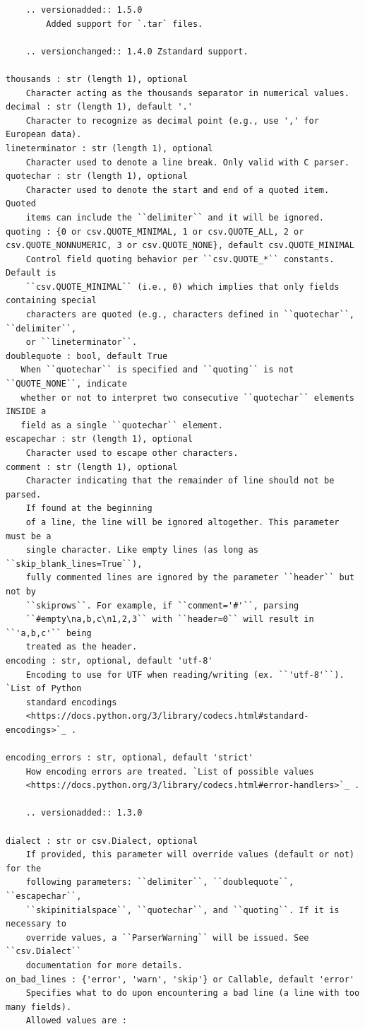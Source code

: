 \documentclass[
  letterpaper,
  DIV=11,
  numbers=noendperiod]{scrreprt}
\begin{document}
\begin{verbatim}
    .. versionadded:: 1.5.0
        Added support for `.tar` files.

    .. versionchanged:: 1.4.0 Zstandard support.

thousands : str (length 1), optional
    Character acting as the thousands separator in numerical values.
decimal : str (length 1), default '.'
    Character to recognize as decimal point (e.g., use ',' for European data).
lineterminator : str (length 1), optional
    Character used to denote a line break. Only valid with C parser.
quotechar : str (length 1), optional
    Character used to denote the start and end of a quoted item. Quoted
    items can include the ``delimiter`` and it will be ignored.
quoting : {0 or csv.QUOTE_MINIMAL, 1 or csv.QUOTE_ALL, 2 or csv.QUOTE_NONNUMERIC, 3 or csv.QUOTE_NONE}, default csv.QUOTE_MINIMAL
    Control field quoting behavior per ``csv.QUOTE_*`` constants. Default is
    ``csv.QUOTE_MINIMAL`` (i.e., 0) which implies that only fields containing special
    characters are quoted (e.g., characters defined in ``quotechar``, ``delimiter``,
    or ``lineterminator``.
doublequote : bool, default True
   When ``quotechar`` is specified and ``quoting`` is not ``QUOTE_NONE``, indicate
   whether or not to interpret two consecutive ``quotechar`` elements INSIDE a
   field as a single ``quotechar`` element.
escapechar : str (length 1), optional
    Character used to escape other characters.
comment : str (length 1), optional
    Character indicating that the remainder of line should not be parsed.
    If found at the beginning
    of a line, the line will be ignored altogether. This parameter must be a
    single character. Like empty lines (as long as ``skip_blank_lines=True``),
    fully commented lines are ignored by the parameter ``header`` but not by
    ``skiprows``. For example, if ``comment='#'``, parsing
    ``#empty\na,b,c\n1,2,3`` with ``header=0`` will result in ``'a,b,c'`` being
    treated as the header.
encoding : str, optional, default 'utf-8'
    Encoding to use for UTF when reading/writing (ex. ``'utf-8'``). `List of Python
    standard encodings
    <https://docs.python.org/3/library/codecs.html#standard-encodings>`_ .

encoding_errors : str, optional, default 'strict'
    How encoding errors are treated. `List of possible values
    <https://docs.python.org/3/library/codecs.html#error-handlers>`_ .

    .. versionadded:: 1.3.0

dialect : str or csv.Dialect, optional
    If provided, this parameter will override values (default or not) for the
    following parameters: ``delimiter``, ``doublequote``, ``escapechar``,
    ``skipinitialspace``, ``quotechar``, and ``quoting``. If it is necessary to
    override values, a ``ParserWarning`` will be issued. See ``csv.Dialect``
    documentation for more details.
on_bad_lines : {'error', 'warn', 'skip'} or Callable, default 'error'
    Specifies what to do upon encountering a bad line (a line with too many fields).
    Allowed values are :


\end{verbatim}
\end{document}

